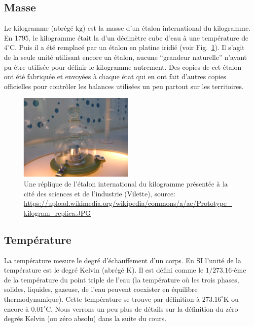 \documentclass[a4paper,12pt]{book}
\newcommand{\kg}{\mathrm{kg}}
\newcommand{\K}{\mathrm{K}}
\newcommand{\C}{\mathrm{C}}
\begin{document}
\subsection{Masse}

Le kilogramme (abrégé $\kg$) est la masse d'un étalon international du kilogramme. En 1795, le kilogramme était la d'un décimètre cube 
d'eau à une température de $4^\circ\C$. Puis il a été remplacé par un étalon en platine iridié (voir Fig.~\ref{fig_kg}). Il s'agit de la seule unité utilisant encore un étalon, 
aucune ``grandeur naturelle'' n'ayant pu être utilisée pour définir le kilogramme autrement. Des copies de cet étalon ont été fabriquée et envoyées à
chaque état qui en ont fait d'autres copies officielles pour contrôler les balances utilisées un peu partout sur les territoires.
\begin{figure}
\begin{center}
\includegraphics[width=0.5\textwidth]{figs/kilogram_replica.jpg}
\caption{Une réplique de l'étalon international du kilogramme présentée à la cité des sciences et de l'industrie (Vilette), source: \url{https://upload.wikimedia.org/wikipedia/commons/a/ac/Prototype_kilogram_replica.JPG}}
\label{fig_kg}
\end{center}
\end{figure}

\subsection{Température}

La température mesure le degré d'échauffement d'un corps. En SI l'unité de la température est le degré Kelvin (abrégé $\K$).
Il est défini comme le $1/273.16$-ème de la température du point triple de l'eau (la température où les trois phases, solides, liquides, gazeuse, de l'eau 
peuvent coexister en équilibre thermodynamique). Cette température se trouve par définition à $273.16^\circ\K$ ou encore à $0.01^\circ\C$.
Nous verrons un peu plus de détails sur la définition du zéro degrés Kelvin (ou zéro absolu) dans la suite du cours.
\end{document}
